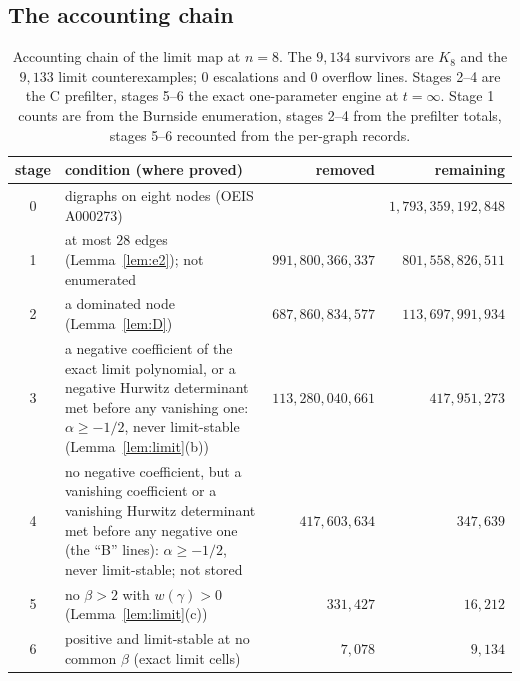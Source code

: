 \documentclass[11pt]{article}
\theoremstyle{definition}
\begin{document}
\subsection{The accounting chain}
\begin{table}[ht]
\centering
\small
\begin{tabular}{@{}cp{}rr@{}}
\toprule
stage & condition (where proved) & removed & remaining\\
\midrule
0 & digraphs on eight nodes (OEIS A000273) & & $1{,}793{,}359{,}192{,}848$\\
1 & at most $28$ edges (Lemma~\ref{lem:e2}); not enumerated & $991{,}800{,}366{,}337$ & $801{,}558{,}826{,}511$\\
2 & a dominated node (Lemma~\ref{lem:D}) & $687{,}860{,}834{,}577$ & $113{,}697{,}991{,}934$\\
3 & a negative coefficient of the exact limit polynomial, or a negative Hurwitz determinant met before any vanishing one: $\alpha\ge-1/2$, never limit-stable (Lemma~\ref{lem:limit}(b)) & $113{,}280{,}040{,}661$ & $417{,}951{,}273$\\
4 & no negative coefficient, but a vanishing coefficient or a vanishing Hurwitz determinant met before any negative one (the ``B'' lines): $\alpha\ge-1/2$, never limit-stable; not stored & $417{,}603{,}634$ & $347{,}639$\\
5 & no $\beta>2$ with $w(\gamma)>0$ (Lemma~\ref{lem:limit}(c)) & $331{,}427$ & $16{,}212$\\
6 & positive and limit-stable at no common $\beta$ (exact limit cells) & $7{,}078$ & $9{,}134$\\
\bottomrule
\end{tabular}
\caption{Accounting chain of the limit map at $n=8$. The $9{,}134$ survivors are $K_8$ and the $9{,}133$ limit
counterexamples; $0$ escalations and $0$ overflow lines. Stages 2--4 are the C prefilter, stages 5--6 the exact
one-parameter engine at $t=\infty$. Stage 1 counts are from the Burnside enumeration, stages 2--4 from the prefilter
totals, stages 5--6 recounted from the per-graph records.}\label{tab:chain8}
\end{table}
\end{document}
